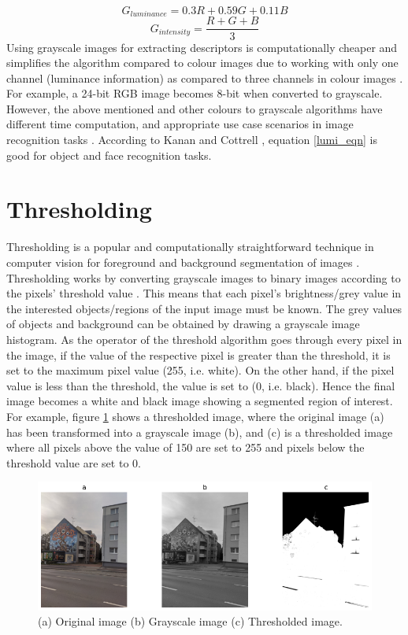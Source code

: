 \begin{equation} \label{lumi_eqn}
G_{luminance} = 0.3R + 0.59G + 0.11B
\end{equation}
\begin{equation} \label{inten_eqn}
G_{intensity} = \frac{R +G+B}{3}
\end{equation}
Using grayscale images for extracting descriptors is computationally cheaper and simplifies the algorithm compared to colour images due to working with only one channel (luminance information) as compared to three channels in colour images \cite{kanan2012color}. For example, a 24-bit RGB image becomes 8-bit when converted to grayscale. However, the above mentioned and other colours to grayscale algorithms have different time computation, and appropriate use case scenarios in image recognition tasks \cite{cadik2008perceptual}. According to Kanan and Cottrell \cite*{kanan2012color}, equation \ref{lumi_eqn} is good for object and face recognition tasks.

\section{Thresholding}
Thresholding is a popular and computationally straightforward technique in computer vision for foreground and background segmentation of images \cite{lee1990comparative}. Thresholding works by converting grayscale images to binary images according to the pixels’ threshold value \cite{nixon2019feature}. This means that each pixel’s brightness/grey value in the interested objects/regions of the input image must be known. The grey values of objects and background can be obtained by drawing a grayscale image histogram.
As the operator of the threshold algorithm goes through every pixel in the image, if the value of the respective pixel is greater than the threshold, it is set to the maximum pixel value (255, i.e. white). On the other hand, if the pixel value is less than the threshold, the value is set to (0, i.e. black). Hence the final image becomes a white and black image showing a segmented region of interest. For example, figure \ref{fig:my_place} shows a thresholded image, where the original image (a) has been transformed into a grayscale image (b), and (c) is a thresholded image where all pixels above the value of 150 are set to 255 and pixels below the threshold value are set to 0. 

\begin{figure}[!htb]
    \centering
    \includegraphics[scale=0.55, keepaspectratio]{Figures/notebook/thresholding.png}
    \caption{(a) Original image (b) Grayscale image (c) Thresholded image.}
    \label{fig:my_place}
\end{figure}  

